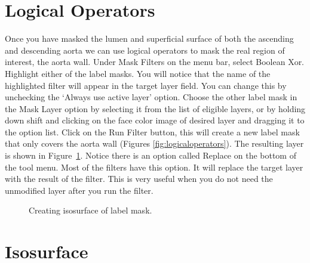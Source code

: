 \documentclass[fleqn,11pt,openany]{book}
\begin{document}
\section{Logical Operators}

Once you have masked the lumen and superficial surface of both the ascending and descending aorta we can use logical operators to mask the real region of interest, the aorta wall.
Under Mask Filters on the menu bar, select Boolean Xor.
Highlight either of the label masks.  You will notice that the name of the highlighted filter will appear in the target layer field.  You can change this by unchecking the `Always use active layer' option. Choose the other label mask in the Mask Layer option by selecting it from the list of eligible layers, or by holding down shift and clicking on the face color image of desired layer and dragging it to the option list.  Click on the Run Filter button, this will create a new label mask that only covers the aorta wall (Figures \ref{fig:logicaloperators}).  The resulting layer is shown in Figure~\ref{fig:creatingisosurface}.  Notice there is an option called Replace on the bottom of the tool menu.  Most of the filters have this option.  It will replace the target layer with the result of the filter.  This is very useful when you do not need the unmodified layer after you run the filter.  


\begin{figure}
\caption{Creating isosurface of label mask.}\label{fig:creatingisosurface}
\end{figure}

\section{Isosurface}
\end{document}
